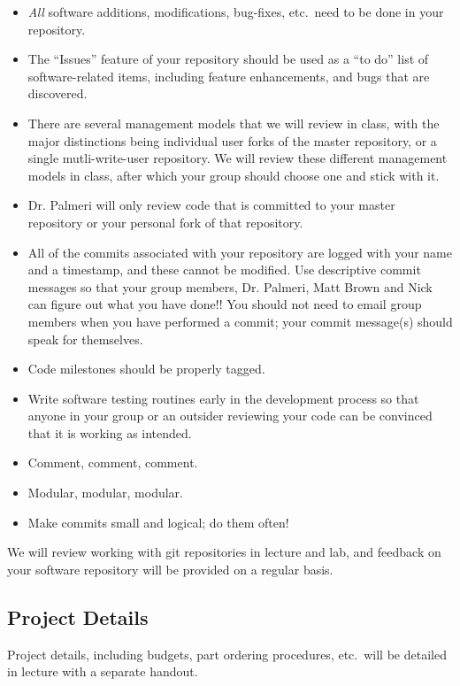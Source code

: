 \begin{itemize}
    \item \emph{All} software additions, modifications, bug-fixes, etc.\ need
        to be done in your repository.
    \item The ``Issues'' feature of your repository should be used as a ``to
        do'' list of software-related items, including feature enhancements,
        and bugs that are discovered.
    \item There are several management models that we will review in class,
        with the major distinctions being individual user forks of the master
        repository, or a single mutli-write-user repository.  We will review
        these different management models in class, after which your group
        should choose one and stick with it.
    \item Dr. Palmeri will only review code that is committed to your master
        repository or your personal fork of that repository.  
    \item All of the commits associated with your repository are logged with
        your name and a timestamp, and these cannot be modified.  Use
        descriptive commit messages so that your group members, Dr. Palmeri,
        Matt Brown and Nick can figure out what you have done!!  You should not
        need to email group members when you have performed a commit; your
        commit message(s) should speak for themselves.
    \item Code milestones should be properly tagged.
    \item Write software testing routines early in the development process so
        that anyone in your group or an outsider reviewing your code can be
        convinced that it is working as intended.
    \item Comment, comment, comment.
    \item Modular, modular, modular.
    \item Make commits small and logical; do them often!
\end{itemize}

We will review working with git repositories in lecture and lab, and feedback
on your software repository will be provided on a regular basis.

\subsection*{Project Details} 
Project details, including budgets, part ordering procedures, etc.\ will be
detailed in lecture with a separate handout.

